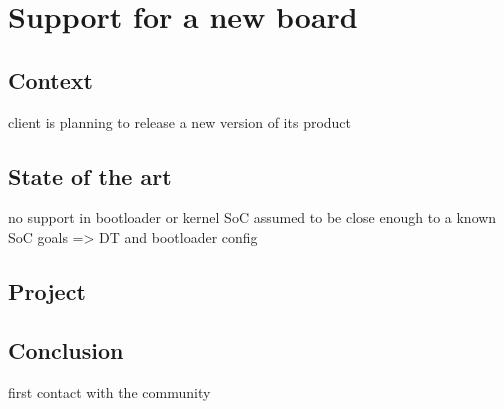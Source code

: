 \chapter{Support for a new board}

\section{Context}
client is planning to release a new version of its product

\section{State of the art}
no support in bootloader or kernel
SoC assumed to be close enough to a known SoC
goals => DT and bootloader config

\section{Project}

\section{Conclusion}
first contact with the community
